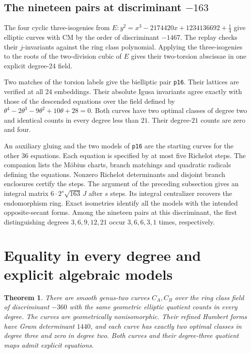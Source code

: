 \documentclass[11pt,letterpaper]{amsart}
\newtheorem{theorem}{Theorem}[section]
\theoremstyle{definition}
\numberwithin{equation}{section}
\begin{document}
\subsection{The nineteen pairs at discriminant \texorpdfstring{\(-163\)}{-163}}

The four cyclic three-isogenies from
\(E:y^2=x^3-2174420x+1234136692+\tfrac14\)
give elliptic curves with CM by the order of discriminant \(-1467\).
The replay checks their \(j\)-invariants against the ring class
polynomial. Applying the three-isogenies to the roots of the
two-division cubic of \(E\) gives their two-torsion abscissae in
one explicit degree-24 field.

Two matches of the torsion labels give the bielliptic pair
\texttt{p16}. Their lattices are verified at all 24 embeddings.
Their absolute Igusa invariants agree exactly with those of the
descended equations over the field defined by
\(\theta^4-2\theta^3-9\theta^2+10\theta+28=0\). Both curves have two
optimal classes of degree two and identical counts in every degree
less than \(21\). Their degree-\(21\) counts are zero and four.

An auxiliary gluing and the two models of \texttt{p16} are the
starting curves for the other \(36\) equations. Each equation is
specified by at most five Richelot steps. The companion lists the
M\"obius charts, branch matchings and quadratic radicals defining
the equations. Nonzero Richelot determinants and disjoint branch
enclosures certify the steps. The argument of the preceding
subsection gives an integral matrix \(6\cdot 2^s\sqrt{163}\,J\)
after \(s\) steps. Its integral centralizer recovers the endomorphism
ring. Exact isometries identify all the models with the intended
opposite-secant forms. Among the nineteen pairs at this discriminant,
the first distinguishing degrees \(3,6,9,12,21\) occur
\(3,6,6,3,1\) times, respectively.


\section{Equality in every degree and explicit algebraic models}
\label{sec:full-spectrum}

\begin{theorem}\label{thm:full-spectrum-pair}
There are smooth genus-two curves \(C_A,C_B\) over the ring class field
of discriminant \(-360\) with the same geometric elliptic quotient
counts in every degree. The curves are geometrically nonisomorphic.
Their refined Humbert forms have Gram determinant \(1440\), and each
curve has exactly two optimal classes in degree three and zero in
degree two. Both curves and their degree-three quotient maps admit
explicit equations.
\end{theorem}
\end{document}
